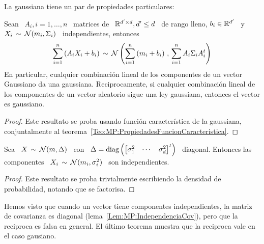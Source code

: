 La gaussiana tiene un par de propiedades particulares:
%
\begin{teorema}[Stabilidad]
\label{Teo:MP:StabilidadGaussiana}
%
  Sean \ $A_i , i = 1,\ldots,n$ \  matrices de \ $\mathbb{R}^{d' \times d}, d' \le d$
  \ de rango lleno, $b_i \in \mathbb{R}^{d'}$ \ y \ $X_i \, \sim \, \mathcal{N}(m_i,\Sigma_i)$
  \ independientes, entonces
  \[
  \sum_{i=1}^n \left(  A_i X_i  + b_i \right)  \, \sim \,  \mathcal{N}\left( \sum_{i=1}^n
    \left( m_i + b_i \right) \, , \, \sum_{i=1}^n A_i \Sigma_i A_i^t \right)
  \]
  En particular, cualquier combinaci\'on lineal  de los componentes de un vector
  Gaussiano da una gaussiana.  Reciprocamente, si cualquier combinaci\'on lineal
  de los componentes de un vector aleatorio sigue una ley gaussiana, entonces el
  vector es gaussiano.
\end{teorema}
%
\begin{proof}
  Este  resultato se proba  usando funci\'on  caracter\'istica de  la gaussiana,
  conjuntalmente al teorema~\ref{Teo:MP:PropiedadesFuncionCaracteristica}.
\end{proof}

%
\begin{teorema}[Independencia]
\label{Teo:MP:IndependenciaGaussiana}
%
  Sea   \   $X  \,   \sim   \,   \mathcal{N}(m,\Delta)$  \   con   \   $\Delta  =   \operatorname{diag}
  \left(  \begin{bmatrix}  \sigma_1^2  &  \cdots  &  \sigma_d^2  \end{bmatrix}^t
  \right)$   \  diagonal.   Entonces  las   componentes  \   $X_i  \,   \sim  \,
  \mathcal{N}(m_i,\sigma_i^2)$ \ son independientes.
\end{teorema}
%
\begin{proof}
  Este resultato se proba  trivialmente escribiendo la densidad de probabilidad,
  notando que se factorisa.
\end{proof}
%
Hemos visto que cuando un  vector tiene componentes independientes, la matriz de
covarianza  es   diagonal  (lema~\ref{Lem:MP:IndependenciaCov}),  pero   que  la
reciproca es falsa en general. El \'ultimo teorema muestra que la reciproca vale
en el caso gausiano.



